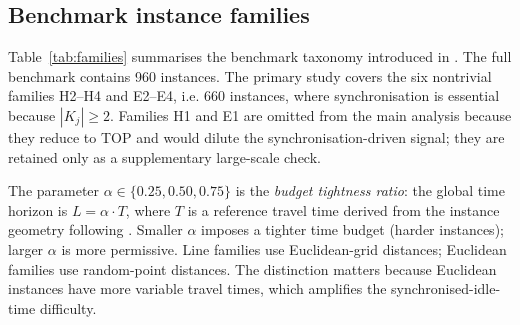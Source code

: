 \documentclass[preprint,12pt]{elsarticle}
\begin{document}
\subsection{Benchmark instance families}

Table~\ref{tab:families} summarises the benchmark taxonomy introduced in \cite{RieraLedesma2021SRPS}. The full benchmark contains 960 instances. The primary study covers the six nontrivial families H2--H4 and E2--E4, i.e. 660 instances, where synchronisation is essential because $|K_j|\ge 2$. Families H1 and E1 are omitted from the main analysis because they reduce to TOP and would dilute the synchronisation-driven signal; they are retained only as a supplementary large-scale check.

\begin{table}[t]
\centering
\caption{SRPS benchmark families.}
\label{tab:families}
\end{table}

\noindent The parameter $\alpha\in\{0.25, 0.50, 0.75\}$ is the \emph{budget tightness ratio}: the global time horizon is $L = \alpha \cdot T$, where $T$ is a reference travel time derived from the instance geometry following \cite{RieraLedesma2021SRPS}. Smaller $\alpha$ imposes a tighter time budget (harder instances); larger $\alpha$ is more permissive. Line families use Euclidean-grid distances; Euclidean families use random-point distances. The distinction matters because Euclidean instances have more variable travel times, which amplifies the synchronised-idle-time difficulty.
\end{document}
